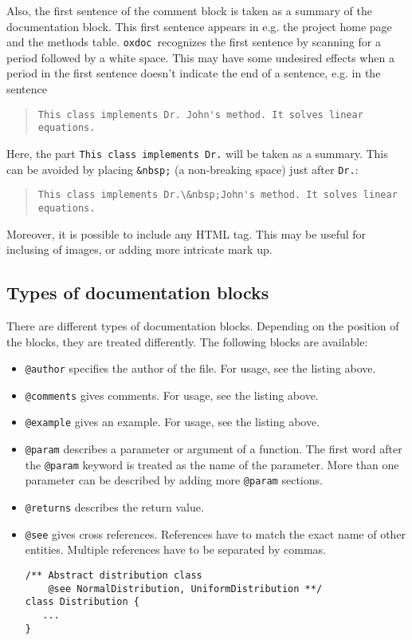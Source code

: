 \documentclass[11pt]{article}
\newcommand\oxdoc{{\tt oxdoc}}
\begin{document}
Also, the first sentence of the comment block is taken as a summary of the
documentation block.  This first sentence appears in e.g. the project home
page and the methods table.  \oxdoc~recognizes the first sentence by
scanning for a period followed by a white space.  This may have some undesired
effects when a period in the first sentence doesn't indicate the end of a
sentence, e.g. in the sentence 
\begin{quote}
\small\begin{verbatim}
This class implements Dr. John's method. It solves linear equations.
\end{verbatim}
\end{quote}
Here, the part {\tt This class implements Dr.} will be taken as a summary.
This can be avoided by placing {\tt \&nbsp;} (a non-breaking space)
just after {\tt Dr.}:
\begin{quote}
\small\begin{verbatim}
This class implements Dr.\&nbsp;John's method. It solves linear equations.
\end{verbatim}
\end{quote}

Moreover, it is possible to include any HTML tag. This may be useful for
inclusing of images, or adding more intricate mark up.


\subsection{Types of documentation blocks}
There are different types of documentation blocks.  Depending on the position of the blocks, they are
treated differently.  The following blocks are available:

\begin{itemize}
\item {\tt @author} specifies the author of the file. For  usage, see the listing above.

\item {\tt @comments} gives comments. For usage, see the listing above.

\item {\tt @example} gives an example. For usage, see the listing above.

\item {\tt @param} describes a parameter or argument of a function. The 
first word after the {\tt @param} keyword is treated as the name of the 
parameter. More than one parameter can be described by adding more {\tt @param} sections.

\item {\tt @returns} describes the return value.

\item {\tt @see} gives cross references. References have to 
match the exact name of other entities. Multiple references have to be
separated by commas.
\begin{lstlisting}
/** Abstract distribution class
    @see NormalDistribution, UniformDistribution **/
class Distribution { 
   ...
}
\end{lstlisting}

\end{itemize}
\end{document}
